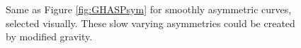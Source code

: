 \documentclass[twocolappendix, numberedappendix]{emulateapj}
\begin{document}
\begin{figure}
\caption{Same as Figure \ref{fig:GHASPsym} for smoothly asymmetric curves, 
selected visually. These slow varying asymmetries could be created by modified
gravity.  
\label{fig:GHASPasym}}
\end{figure}
\end{document}
